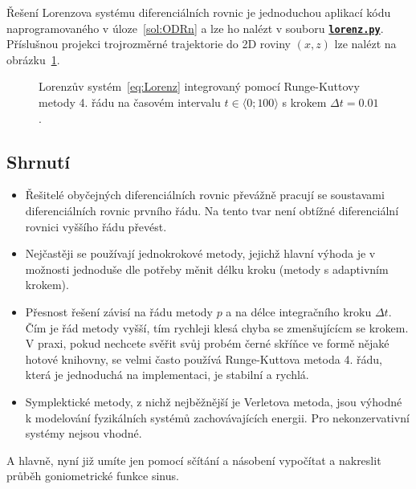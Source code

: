 \documentclass[a4paper,11pt,twoside]{article}
\def\ghfile#1#2{\textnormal{\textbf{\texttt{\href{https://github.com/PavelStransky/PCInPhysics/blob/main/#1#2}{#2}}}}}
\theoremstyle{red}
\theoremstyle{green}
\begin{document}
\begin{solution}
    Řešení Lorenzova systému diferenciálních rovnic je jednoduchou aplikací kódu naprogramovaného v úloze~\ref{sol:ODRn} a lze ho nalézt v souboru \ghfile{python/ode/}{lorenz.py}.
    Příslušnou projekci trojrozměrné trajektorie do 2D roviny $(x,z)$ lze nalézt na obrázku~\ref{fig:Lorenz}.

    \begin{figure}[!htbp]
        \centering
        \caption{
            \protect\small
                Lorenzův systém~\eqref{eq:Lorenz} integrovaný pomocí Runge-Kuttovy metody 4. řádu na časovém intervalu $t\in\langle0;100\rangle$ s krokem $\Delta t=0.01$.
            }	
        \label{fig:Lorenz}
    \end{figure}
\end{solution}

\subsection{Shrnutí}
\begin{itemize}
\item 
    Řešitelé obyčejných diferenciálních rovnic převážně pracují se soustavami diferenciálních rovnic prvního řádu.
    Na tento tvar není obtížné diferenciální rovnici vyššího řádu převést.

\item
    Nejčastěji se používají jednokrokové metody, jejichž hlavní výhoda je v možnosti jednoduše dle potřeby měnit délku kroku (metody s adaptivním krokem).

\item 
    Přesnost řešení závisí na řádu metody $p$ a na délce integračního kroku $\Delta t$.
    Čím je řád metody vyšší, tím rychleji klesá chyba se zmenšujícícm se krokem.
    V praxi, pokud nechcete svěřit svůj probém černé skříňce ve formě nějaké hotové knihovny, se velmi často používá Runge-Kuttova metoda 4. řádu, která je jednoduchá na implementaci, je stabilní a rychlá.

\item
    Symplektické metody, z nichž nejběžnější je Verletova metoda, jsou výhodné k modelování fyzikálních systémů zachovávajících energii.
    Pro nekonzervativní systémy nejsou vhodné. 
\end{itemize}
A hlavně, nyní již umíte jen pomocí sčítání a násobení vypočítat a nakreslit průběh goniometrické funkce sinus.
\end{document}
